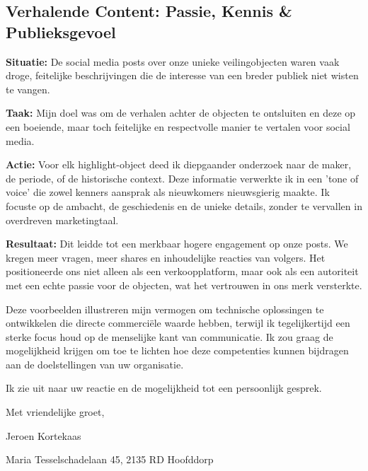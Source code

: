 \documentclass[11pt,a4paper]{article}
\begin{document}
\vspace{1em}

\subsection{Verhalende Content: Passie, Kennis \& Publieksgevoel}

\textbf{\color{accentgray}Situatie:} De social media posts over onze unieke veilingobjecten waren vaak droge, feitelijke beschrijvingen die de interesse van een breder publiek niet wisten te vangen.

\textbf{\color{accentgray}Taak:} Mijn doel was om de verhalen achter de objecten te ontsluiten en deze op een boeiende, maar toch feitelijke en respectvolle manier te vertalen voor social media.

\textbf{\color{accentgray}Actie:} Voor elk highlight-object deed ik diepgaander onderzoek naar de maker, de periode, of de historische context. Deze informatie verwerkte ik in een 'tone of voice' die zowel kenners aansprak als nieuwkomers nieuwsgierig maakte. Ik focuste op de ambacht, de geschiedenis en de unieke details, zonder te vervallen in overdreven marketingtaal.

\textbf{\color{accentgray}Resultaat:} Dit leidde tot een merkbaar hogere engagement op onze posts. We kregen meer vragen, meer shares en inhoudelijke reacties van volgers. Het positioneerde ons niet alleen als een verkoopplatform, maar ook als een autoriteit met een echte passie voor de objecten, wat het vertrouwen in ons merk versterkte.

\vspace{1.5em}

Deze voorbeelden illustreren mijn vermogen om technische oplossingen te ontwikkelen die directe commerciële waarde hebben, terwijl ik tegelijkertijd een sterke focus houd op de menselijke kant van communicatie. Ik zou graag de mogelijkheid krijgen om toe te lichten hoe deze competenties kunnen bijdragen aan de doelstellingen van uw organisatie.

Ik zie uit naar uw reactie en de mogelijkheid tot een persoonlijk gesprek.

\vspace{1em}

Met vriendelijke groet,

\vspace{2em}

Jeroen Kortekaas

\vspace{0.5em}

{\small\color{lightgray}Maria Tesselschadelaan 45, 2135 RD Hoofddorp}
\end{document}
